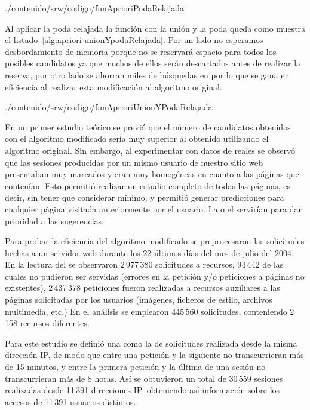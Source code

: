 
                 {./contenido/srw/codigo/funAprioriPodaRelajada}

Al aplicar la poda relajada la función con la unión y la poda queda como muestra el listado~\ref{alg:apriori-unionYpodaRelajada}. Por un lado no esperamos desbordamiento de memoria porque no se reservará espacio para todos los posibles candidatos ya que muchos de ellos serán descartados antes de realizar la reserva, por otro lado se ahorran miles de búsquedas en \aprioriL[k-1] por lo que se gana en eficiencia al realizar esta modificación al algoritmo original.


                 {./contenido/srw/codigo/funAprioriUnionYPodaRelajada}

En un primer estudio teórico se previó que el número de candidatos obtenidos con el algoritmo modificado sería muy superior al obtenido utilizando el algoritmo original. Sin embargo, al experimentar con datos de \flogs reales se observó que las sesiones producidas por un mismo usuario de nuestro sitio web presentaban \patrones muy marcados y eran muy homogéneas en cuanto a las páginas que contenían. Esto permitió realizar un estudio completo de todas las páginas, es decir, sin tener que considerar \soporte mínimo, y permitió generar predicciones para cualquier página visitada anteriormente por el usuario. La \confianza o el \lift servirían para dar prioridad a las sugerencias.

Para probar la eficiencia del algoritmo modificado se preprocesaron las solicitudes hechas a un servidor web durante los 22 últimos días del mes de julio del 2004. En la lectura del \flog se observaron 2\,977\,380 solicitudes a recursos, 94\,442 de las cuales no pudieron ser servidas (errores en la petición y/o peticiones a páginas no existentes), 2\,437\,378 peticiones fueron realizadas a recursos auxiliares a las páginas solicitadas por los usuarios (imágenes, ficheros de estilo, archivos multimedia, etc.) En el análisis se emplearon 445\,560 solicitudes, conteniendo 2\,158 recursos diferentes.

Para este estudio se definió una \sn como la \secuencia de solicitudes realizada desde la misma dirección IP, de modo que entre una petición y la siguiente no transcurrieran más de 15 minutos, y entre la primera petición y la última de una sesión no transcurrieran más de 8 horas. Así se obtuvieron un total de 30\,559 sesiones realizadas desde 11\,391 direcciones IP, obteniendo así información sobre los accesos de 11\,391 usuarios distintos.

